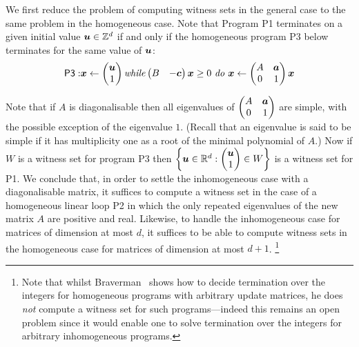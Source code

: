 We first reduce the problem of computing witness sets in the general
case to the same problem in the homogeneous case.  Note that Program
\textsf{P1} terminates on a given initial value $\boldsymbol{u}\in
\mathbb{Z}^d$ if and only if the homogeneous program \textsf{P3} below
terminates for the same value of $\boldsymbol{u}$:
\begin{align*}
\mathsf{P3:} \boldsymbol{x}\gets
\begin{pmatrix} \boldsymbol{u}\\ 1\end{pmatrix} \mbox{\textit{while}} \begin{pmatrix}B &-\boldsymbol{c} \end{pmatrix}
\boldsymbol{x} \geq 0 \mbox{ \textit{do} } \boldsymbol{x}\leftarrow
\begin{pmatrix}A&\boldsymbol{a}\\ 0 & 1
\end{pmatrix} \boldsymbol{x}
\end{align*}

Note that if $A$ is diagonalisable then all
eigenvalues of
$\begin{pmatrix}A&\boldsymbol{a}\\ 0 & 1
\end{pmatrix}$ are simple, with the possible exception of the
eigenvalue $1$.  (Recall that an eigenvalue is said to be simple if it
has multiplicity one as a root of the minimal polynomial of $A$.)  Now
if $W$ is a witness set for program \textsf{P3} then $\left\{
  \boldsymbol{u} \in \mathbb{R}^d : \begin{pmatrix} \boldsymbol{u}\\
    1\end{pmatrix} \in W \right\}$ is a witness set for \textsf{P1}.
We conclude that, in order to settle the inhomogeneous case with a
diagonalisable matrix, it suffices to compute a witness set in the
case of a homogeneous linear loop \textsf{P2} in which the only
repeated eigenvalues of the new matrix $A$ are positive and real.
Likewise, to handle the inhomogeneous case for matrices of dimension
at most $d$, it suffices to be able to compute witness sets in the
homogeneous case for matrices of dimension at most $d+1$.%
\footnote{Note that whilst Braverman~\cite{Bra06} shows how to decide
  termination over the integers for homogeneous programs with
  arbitrary update matrices, he does \emph{not} compute a witness set
  for such programs---indeed this remains an open problem since it
  would enable one to solve termination over the integers for
  arbitrary inhomogeneous programs.}

